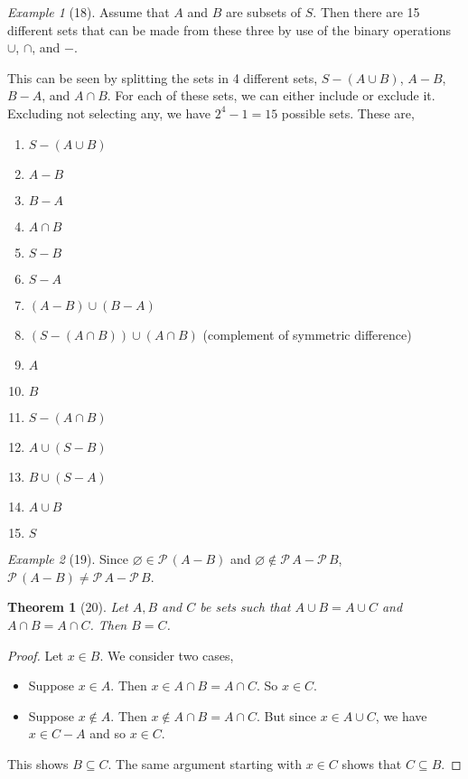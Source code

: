 \documentclass[12pt]{article}
\theoremstyle{plain}
\newtheorem*{exthm}{Theorem}
\theoremstyle{remark}
\newtheorem*{eg}{Example}
\theoremstyle{definition}
\theoremstyle{remark}
\newcommand{\powerset}{\mathscr{P}\,}
\begin{document}
\begin{eg}[18]
  Assume that $A$ and $B$ are subsets of $S$. Then there are 15 different sets that can be made from these three by use of the binary operations $\cup$, $\cap$, and $-$.

  This can be seen by splitting the sets in 4 different sets, $S - (A \cup B)$, $A - B$, $B - A$, and $A \cap B$. For each of these sets, we can either include or exclude it. Excluding not selecting any, we have $2^4 - 1 = 15$ possible sets. These are,

  \begin{enumerate}
    \item $S - (A \cup B)$
    \item $A - B$
    \item $B - A$
    \item $A \cap B$
    \item $S - B$
    \item $S - A$
    \item $(A - B) \cup (B - A)$
    \item $(S - (A \cap B)) \cup (A \cap B)$ (complement of symmetric difference)
    \item $A$
    \item $B$
    \item $S - (A \cap B)$
    \item $A \cup (S - B)$
    \item $B \cup (S - A)$
    \item $A \cup B$
    \item $S$
  \end{enumerate}
\end{eg}

\begin{eg}[19]
  Since $\varnothing \in \powerset (A - B)$ and $\varnothing \not\in \powerset A - \powerset B$, $\powerset(A - B) \neq \powerset A - \powerset B$.
\end{eg}

\begin{exthm}[20]
  Let $A, B$ and $C$ be sets such that $A \cup B = A \cup C$ and $A \cap B = A \cap C$. Then $B = C$.
\end{exthm}
\begin{proof}
  Let $x \in B$. We consider two cases,
  \begin{itemize}
    \item Suppose $x \in A$. Then $x \in A \cap B = A \cap C$. So $x \in C$.
    \item Suppose $x \not\in A$. Then $x \not\in A \cap B = A \cap C$. But since $x \in A \cup C$, we have $x \in C - A$ and so $x \in C$.
  \end{itemize}
  This shows $B \subseteq C$. The same argument starting with $x \in C$ shows that $C \subseteq B$.
\end{proof}
\end{document}
